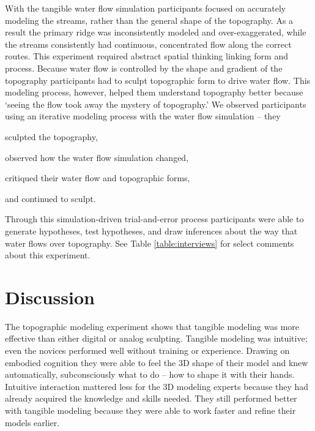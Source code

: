 \documentclass[Afour,sagev,times]{sagej} %
\begin{document}
With the tangible water flow simulation
participants focused on accurately modeling the streams, 
rather than the general shape of the topography. 
As a result the primary ridge was 
inconsistently modeled and over-exaggerated,
while the streams consistently 
had continuous, concentrated flow 
along the correct routes.
This experiment required abstract spatial thinking linking form and process. 
Because water flow is controlled by the shape and gradient of the topography
participants had to sculpt topographic form to drive water flow. 
This modeling process, however, helped them understand topography better 
because `seeing the flow took away the mystery of topography.'
%
We observed participants using an iterative modeling process 
with the water flow simulation -- 
they 
\begin{enumerate*}[label=\alph*),font=\itshape]
\item sculpted the topography, 
\item observed how the water flow simulation changed, 
\item critiqued their water flow and topographic forms, 
\item and continued to sculpt.
\end{enumerate*}
%
Through this simulation-driven trial-and-error process 
participants were able 
to generate hypotheses, test hypotheses, and draw inferences 
about the way that water flows over topography. 
See Table \ref{table:interviews} for select comments about this experiment.





\section{Discussion}


The topographic modeling experiment
shows that tangible modeling was 
more effective than either digital or analog sculpting. 
Tangible modeling was intuitive;
even the novices performed well without training or experience.
Drawing on embodied cognition
they were able to feel the 3D shape of their model
and knew automatically, subconsciously what to do --
how to shape it with their hands.
Intuitive interaction mattered less for the 3D modeling experts
because they had already acquired the knowledge and skills needed.
They still performed better with tangible modeling
because they were able to 
work faster and refine their models earlier. 
\end{document}
